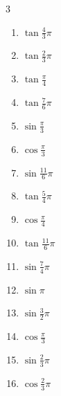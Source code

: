 \begin{multicols}{3}
\begin{enumerate}
  \item $\displaystyle \tan{\frac{4}{3}\pi}$

  \item $\displaystyle \tan{\frac{2}{3}\pi}$

  \item $\displaystyle \tan{\frac{\pi}{4}}$
        \phantom{$\displaystyle =1$}

  \item $\displaystyle \tan{\frac{7}{6}\pi}$

  \item $\displaystyle \sin{\frac{\pi}{3}}$

  \item $\displaystyle \cos{\frac{\pi}{3}}$

  \item $\displaystyle \sin{\frac{11}{6}\pi}$

  \item $\displaystyle \tan{\frac{5}{4}\pi}$
        \phantom{$\displaystyle =1$}

  \item $\displaystyle \cos{\frac{\pi}{4}}$

  \item $\displaystyle \tan{\frac{11}{6}\pi}$

  \item $\displaystyle \sin{\frac{7}{4}\pi}$

  \item $\displaystyle \sin{\pi}$
        \phantom{$\displaystyle =0$}

  \item $\displaystyle \sin{\frac{3}{2}\pi}$
        \phantom{$\displaystyle =-1$}

  \item $\displaystyle \cos{\frac{\pi}{3}}$

  \item $\displaystyle \sin{\frac{2}{3}\pi}$

  \item $\displaystyle \cos{\frac{2}{3}\pi}$


\end{enumerate}
\end{multicols}

